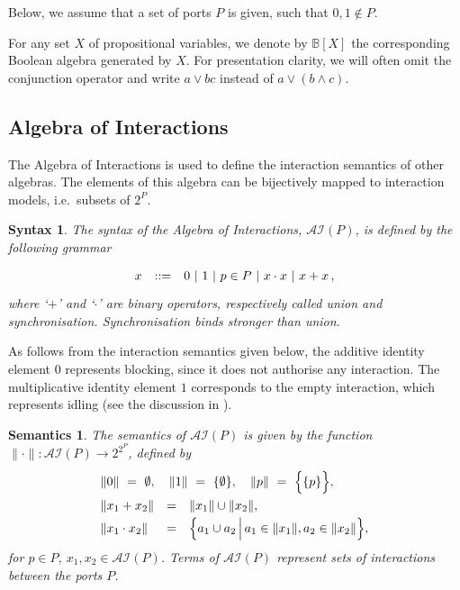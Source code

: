 \documentclass{llncs}
\newcommand{\sB}{\ensuremath{\mathbb{B}}}
\newcommand{\ie}[1][\ ]{i.e.#1}
\newtheorem*{syntax}{Syntax}
\newtheorem*{semantics}{Semantics}
\newcommand{\ai}{\ensuremath{\mathcal{AI}}}
\begin{document}
Below, we assume that a set of ports $P$ is given, such that $0,1\not\in
P$.

For any set $X$ of propositional variables, we denote by $\sB[X]$ the
corresponding Boolean algebra generated by $X$.  For presentation
clarity, we will often omit the conjunction operator and write $a \lor
bc$ instead of $a \lor (b \land c)$.



\subsection{Algebra of Interactions}
\label{secn:ai}

The Algebra of Interactions is used to define the interaction semantics of other algebras. The elements of this algebra can be bijectively mapped to interaction models, \ie subsets of $2^P$.

\begin{syntax}
The syntax of the {\em Algebra of Interactions}, $\ai(P)$, is defined by
the following grammar
%
\begin{equation} \label{eq:apsynt}
  \begin{array}{rc*{4}{l@{\ |\ }}l}
    x & ::= & 0 & 1 & p \in P & x\cdot x & x + x \,,\\
  \end{array}
\end{equation}
%
where `$+$' and `$\cdot$' are binary operators, respectively called
{\em union} and {\em synchronisation}.  Synchronisation binds stronger
than union.
\end{syntax}
%
As follows from the interaction semantics given below, the additive
identity element $0$ represents blocking, since it does not authorise
any interaction.  The multiplicative identity element $1$ corresponds
to the empty interaction, which represents idling (see the discussion
in \cite{BarBliu15-offer-scico}).

\begin{semantics}
The semantics of $\ai(P)$ is given by the function $\|\cdot\| : \ai(P)
\rightarrow 2^{2^P}$, defined by
%
\begin{equation} \label{eq:apsem}
  \renewcommand{\arraystretch}{1.5}
  \begin{array}{lcl}
    \lefteqn{\|0\|\ =\ \emptyset,\quad \|1\|\ =\ \{\emptyset\},\quad
      \|p\|\ =\ \Big\{\{p\}\Big\},}\\
    \|x_1 + x_2\| &=& \|x_1\| \cup \|x_2\|,\\
    \|x_1 \cdot x_2\| &=& 
    \Big\{a_1 \cup a_2\,\Big|\, a_1\in \|x_1\|, a_2\in \|x_2\| \Big\},
  \end{array}
\end{equation}
for $p\in P$, $x_1,x_2\in\ai(P)$.  Terms of $\ai(P)$ represent sets of
interactions between the ports $P$.
\end{semantics}
\end{document}
